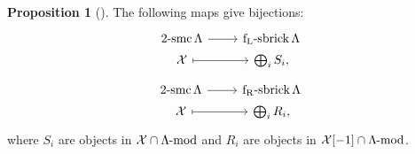 \documentclass[pdftex,a4paper]{article}
\numberwithin{equation}{subsection}
\theoremstyle{definition}
\newtheorem{proposition}[theorem]{Proposition}
\newcommand{\lmod}{\operatorname{\mathrm{\hspace{-2pt}-mod}}}
\newcommand{\flsbrick}{\operatorname{\mathrm{f_L-sbrick}}}
\newcommand{\frsbrick}{\operatorname{\mathrm{f_R-sbrick}}}
\newcommand{\twosmc}{\operatorname{\mathrm{2-smc}}}
\begin{document}
\begin{proposition}[{\cite[Theorem 3.3]{MR4139031}}]\label{asaibj}
	The following maps give bijections:
	\begin{equation}\label{asaibjfl}
		\begin{tikzcd}[row sep=1pt]
			\twosmc \Lambda \ar[r]&\flsbrick \Lambda\\
			\mathcal{X}\ar[r,mapsto]&\bigoplus_{i}S_i,
		\end{tikzcd}
	\end{equation}
	\begin{equation}\label{asabjfr}
		\begin{tikzcd}[row sep=1pt]
			\twosmc \Lambda \ar[r]&\frsbrick \Lambda\\
			\mathcal{X}\ar[r,mapsto]&\bigoplus_{i}R_i,
		\end{tikzcd}
	\end{equation}
	where \(S_i\) are objects in \(\mathcal{X}\cap \Lambda\lmod\) and \(R_i\) are objects in \(\mathcal{X}[-1]\cap \Lambda\lmod\).
\end{proposition}
\end{document}
